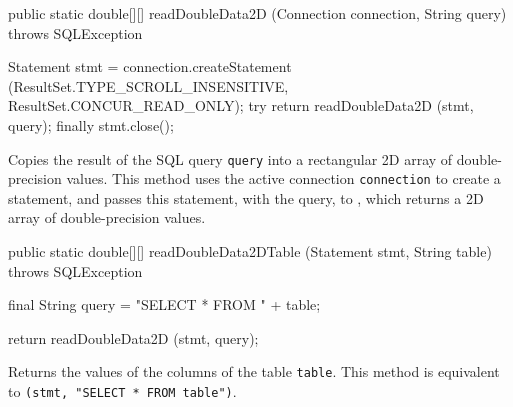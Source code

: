 \begin{htmlonly}
\end{htmlonly}
\begin{code}

   public static double[][] readDoubleData2D (Connection connection,
                                              String query)
            throws SQLException\begin{hide} {
      Statement stmt = connection.createStatement
      (ResultSet.TYPE_SCROLL_INSENSITIVE, ResultSet.CONCUR_READ_ONLY);
      try {
         return readDoubleData2D (stmt, query);
      }
      finally {
         stmt.close();
      }
   }\end{hide}
\end{code}
\begin{tabb}
   Copies the result of the SQL query \texttt{query} into a rectangular 2D array
   of double-precision values.
   This method uses the active connection \texttt{connection} to create
   a statement, and passes this statement, with the query, to
   , which returns a 2D
   array of double-precision values.
\end{tabb}
\begin{htmlonly}
\end{htmlonly}
\begin{code}

   public static double[][] readDoubleData2DTable (Statement stmt,
                                                   String table)
            throws SQLException\begin{hide} {
        final String query = "SELECT * FROM " + table;
        
        return readDoubleData2D (stmt, query);
    }\end{hide}
\end{code}
\begin{tabb}
   Returns the values of the columns of the table \texttt{table}.
   This method is equivalent to 
   \texttt{(stmt, "SELECT * FROM table")}.
\end{tabb}
